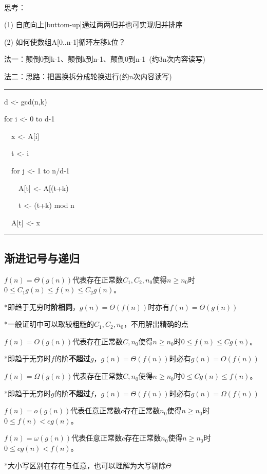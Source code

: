 \documentclass[a4paper,UTF8,fontset=windows]{ctexart}
\newenvironment{code}{\rule{36em}{0.1em}\setlength{\parindent}{1em}

}{

\setlength{\parindent}{0em}\rule{36em}{0.1em}}
\begin{document}
\

思考：

(1) 自底向上[buttom-up]通过两两归并也可实现归并排序

(2) 如何使数组A[0..n-1]循环左移k位？

法一：颠倒0到k-1、颠倒k到n-1、颠倒0到n-1\ (约3n次内容读写)

法二：思路：把置换拆分成轮换进行(约n次内容读写)

\begin{code}
d <- gcd(n,k)

for i <- 0 to d-1

\ \ x <- A[i]

\ \ t <- i

\ \ for j <- 1 to n/d-1

\ \ \ \ A[t] <- A[(t+k)%

\ \ \ \ t <- (t+k) mod n

\ \ A[t] <- x
\end{code}

\subsection{渐进记号与递归}

$f(n)=\Theta(g(n))$代表存在正常数$C_1,C_2,n_0$使得$n\ge n_0$时$0\le C_1g(n)\le f(n)\le C_2g(n)$。

*\hspace{0em}即趋于无穷时\textbf{阶相同}，$g(n)=\Theta(f(n))$时亦有$f(n)=\Theta(g(n))$

*\hspace{0em}一般证明中可以取较粗糙的$C_1,C_2,n_0$，不用解出精确的点

$f(n)=O(g(n))$代表存在正常数$C,n_0$使得$n\ge n_0$时$0\le f(n)\le Cg(n)$。

*\hspace{0em}即趋于无穷时$f$的阶\textbf{不超过}$g$，$g(n)=\Theta(f(n))$时必有$g(n)=O(f(n))$

$f(n)=\Omega(g(n))$代表存在正常数$C,n_0$使得$n\ge n_0$时$0\le C g(n)\le f(n)$。

*\hspace{0em}即趋于无穷时$g$的阶\textbf{不超过}$f$，$g(n)=\Theta(f(n))$时必有$g(n)=\Omega(f(n))$

$f(n)=o(g(n))$代表任意正常数$c$存在正常数$n_0$使得$n\ge n_0$时$0\le f(n)< cg(n)$。

$f(n)=\omega(g(n))$代表任意正常数$c$存在正常数$n_0$使得$n\ge n_0$时$0\le cg(n) < f(n)$。

*\hspace{0em}大小写区别在存在与任意，也可以理解为大写剔除$\Theta$
\end{document}
